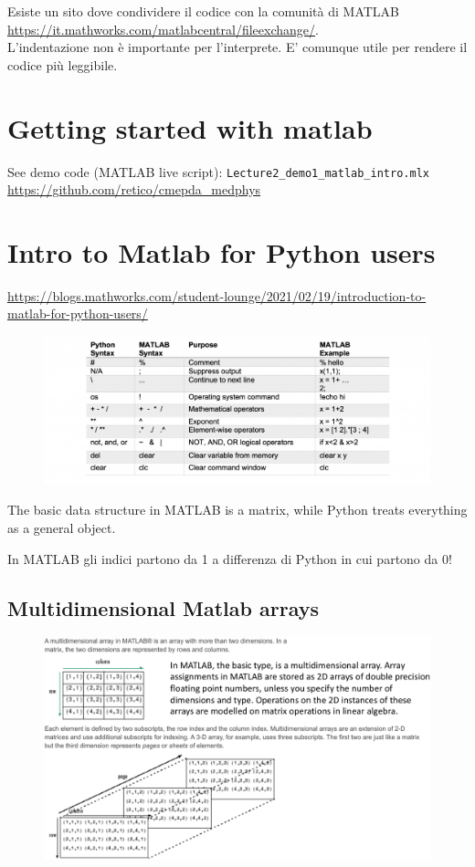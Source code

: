 Esiste un sito dove condividere il codice con la comunità di MATLAB \url{https://it.mathworks.com/matlabcentral/fileexchange/}.\\

L'indentazione non è importante per l'interprete. E' comunque utile per rendere il codice più leggibile.

\section{Getting started with matlab}
See demo code (MATLAB live script): \texttt{Lecture2\_demo1\_matlab\_intro.mlx} \url{https://github.com/retico/cmepda_medphys}



\section{Intro to Matlab for Python users}
\url{https://blogs.mathworks.com/student-lounge/2021/02/19/introduction-to-matlab-for-python-users/}

\begin{figure}[ht]
	\centering
	\includegraphics[width=1\linewidth]{figure_med/python-matlab}
\end{figure}
\FloatBarrier

The basic data structure in MATLAB is a matrix, while Python treats everything as a general object.

In MATLAB gli indici partono da 1 a differenza di Python in cui partono da 0!

\newpage
\subsection{Multidimensional Matlab arrays}

\begin{figure}[ht]
	\centering
	\includegraphics[width=1\linewidth]{figure_med/Multidim_matlab_arrays}
\end{figure}
\FloatBarrier

